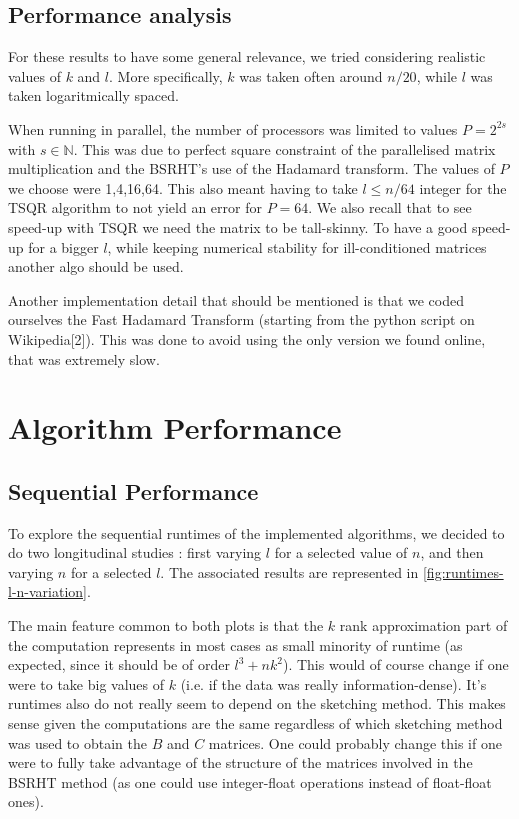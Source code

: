 \documentclass[a4paper, 12pt,oneside]{article}
\begin{document}
	\subsection{Performance analysis}
		For these results to have some general relevance, we tried considering realistic values of $k$ and $l$. More specifically, $k$ was taken often around $n/20$, while $l$ was taken logaritmically spaced.
	
		When running in parallel, the number of processors was limited to values $P=2^{2s}$ with $s\in\mathbb{N}$. This was due to perfect square constraint of the parallelised matrix multiplication and the BSRHT's use of the Hadamard transform. The values of $P$ we choose were 1,4,16,64. 		
		This also meant having to take $l\le n/64$ integer for the TSQR algorithm to not yield an error for $P=64$. We also recall that to see speed-up with TSQR we need the matrix to be tall-skinny. To have a good speed-up for a bigger $l$, while keeping numerical stability for ill-conditioned matrices another algo should be used.	

		Another implementation detail that should be mentioned is that we coded ourselves the Fast Hadamard Transform (starting from the python script on Wikipedia[2]). This was done to avoid using the only version we found online, that was extremely slow.
		\section{Algorithm Performance}
        \subsection{Sequential Performance}
		To explore the sequential runtimes of the implemented algorithms, we decided to do two longitudinal studies : first varying $l$ for a selected value of $n$, and then varying $n$ for a selected $l$. The associated results are represented in \ref{fig:runtimes-l-n-variation}. 

		The main feature common to both plots is that the $k$ rank approximation part of the computation represents in most cases as small minority of runtime (as expected, since it should be of order $l^3 +nk^2$). This would of course change if one were to take big values of $k$ (i.e. if the data was really information-dense).  	
		It's runtimes also do not really seem to depend on the sketching method. This makes sense given the computations are the same regardless of which sketching method was used to obtain the $B$ and $C$ matrices. One could probably change this if one were to fully take advantage of the structure of the matrices involved in the BSRHT method (as one could use integer-float operations instead of float-float ones). 
\end{document}
